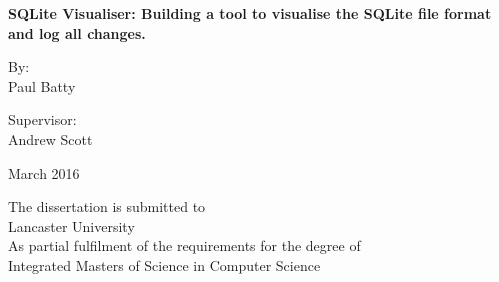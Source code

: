 %
%
%
%
%
%

\begin{titlepage}
	\begin{center}
		\begin{huge}
			\textbf{SQLite Visualiser: Building a tool to visualise the SQLite file format and log all changes.}
		\end{huge}	
		
		
		\vspace{2cm}		
		
		\normalsize By:   \\
		\large Paul Batty
		
		\vspace{2.5cm}
		
		\normalsize Supervisor: \\
		\large Andrew Scott
		
		\vspace{1.5cm}
		
		\large March 2016
		
		\vfill 
		
		\normalsize
		The dissertation is submitted to \\
		Lancaster University \\
		As partial fulfilment of the requirements for the degree of \\
		Integrated Masters of Science in Computer Science \\
	\end{center} 
\end{titlepage}
